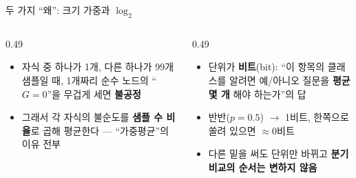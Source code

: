 \begin{frame}{두 가지 ``왜'': 크기 가중과 $\log_2$}
  \begin{columns}[T]
    \begin{column}{0.49\textwidth}
      \begin{itemize}
        \item 자식 중 하나가 1개, 다른 하나가 99개 샘플일 때,
          1개짜리 순수 노드의 ``$G=0$''을 무겁게 세면 \textbf{불공정}
        \item 그래서 각 자식의 불순도를 \textbf{샘플 수 비율}로 곱해
          평균한다 — ``가중평균''의 이유 전부
      \end{itemize}
    \end{column}
    \begin{column}{0.49\textwidth}
      \begin{itemize}
        \item 단위가 \textbf{비트}(bit): ``이 항목의 클래스를 알려면
          예/아니오 질문을 \textbf{평균 몇 개} 해야 하는가''의 답
        \item 반반($p=0.5$) $\to$ 1비트, 한쪽으로 쏠려 있으면 $\approx 0$비트
        \item 다른 밑을 써도 단위만 바뀌고 \textbf{분기 비교의 순서는
          변하지 않음}
      \end{itemize}
    \end{column}
  \end{columns}
\end{frame}
